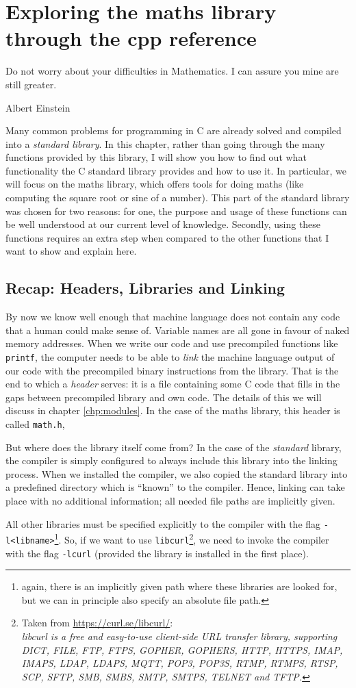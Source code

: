 \chapter{Exploring the maths library through the cpp reference}\label{chp:maths}
\epigraph{Do not worry about your difficulties in Mathematics. I can assure you mine are still greater.}{Albert Einstein}

Many common problems for programming in C are already solved and compiled into a \emph{standard library}. In this chapter, rather than going through the many functions provided by this library, I will show you how to find out what functionality the C standard library provides and how to use it. In particular, we will focus on the maths library, which offers tools for doing maths (like computing the square root or sine of a number). This part of the standard library was chosen for two reasons: for one, the purpose and usage of these functions can be well understood at our current level of knowledge. Secondly, using these functions requires an extra step when compared to the other functions that I want to show and explain here.

\section{Recap: Headers, Libraries and Linking}
By now we know well enough that machine language does not contain any code that a human could make sense of. Variable names are all gone in favour of naked memory addresses. When we write our code and use precompiled functions like \texttt{printf}, the computer needs to be able to \emph{link} the machine language output of our code with the precompiled binary instructions from the library. That is the end to which a \emph{header} serves: it is a file containing some C code that fills in the gaps between precompiled library and own code. The details of this we will discuss in chapter \ref{chp:modules}. In the case of the maths library, this header is called \texttt{math.h},

But where does the library itself come from? In the case of the \emph{standard} library, the compiler is simply configured to always include this library into the linking process. When we installed the compiler, we also copied the standard library into a  predefined directory which is \enquote{known} to the compiler. Hence, linking can take place with no additional information; all needed file paths are implicitly given.

All other libraries must be specified explicitly to the compiler with the flag \texttt{-l<libname>}\footnote{again, there is an implicitly given path where these libraries are looked for, but we can in principle also specify an absolute file path.}. So, if we want to use \texttt{libcurl}\footnote{Taken from \url{https://curl.se/libcurl/}:\\
\emph{libcurl is a free and easy-to-use client-side URL transfer library, supporting DICT, FILE, FTP, FTPS, GOPHER, GOPHERS, HTTP, HTTPS, IMAP, IMAPS, LDAP, LDAPS, MQTT, POP3, POP3S, RTMP, RTMPS, RTSP, SCP, SFTP, SMB, SMBS, SMTP, SMTPS, TELNET and TFTP.}}, we need to invoke the compiler with the flag \texttt{-lcurl} (provided the library is installed in the first place).

